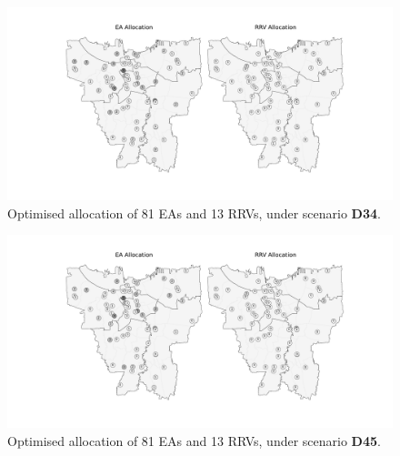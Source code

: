 \documentclass[preprint,12pt]{elsarticle}
\begin{document}
\begin{figure}
\begin{center}
\includegraphics[width=\textwidth]{img/map_optimised_34}
\caption{Optimised allocation of 81 EAs and 13 RRVs, under scenario \textbf{D34}.}
\label{fig:optimal_current_allocation_34}
\end{center}
\end{figure}

\begin{figure}
\begin{center}
\includegraphics[width=\textwidth]{img/map_optimised_45}
\caption{Optimised allocation of 81 EAs and 13 RRVs, under scenario \textbf{D45}.}
\label{fig:optimal_current_allocation_45}
\end{center}
\end{figure}





\end{document}
